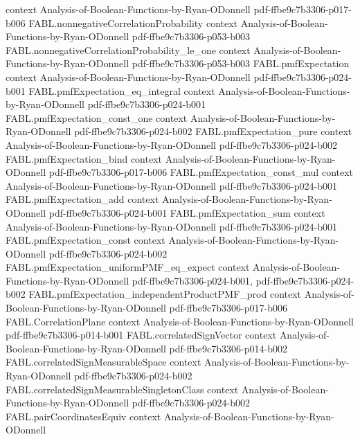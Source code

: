 \begin{theorem}
  {context}
  {Analysis-of-Boolean-Functions-by-Ryan-ODonnell}
  {pdf-ffbe9c7b3306-p017-b006}
\proofstep
  {FABL.nonnegativeCorrelationProbability}
  {context}
  {Analysis-of-Boolean-Functions-by-Ryan-ODonnell}
  {pdf-ffbe9c7b3306-p053-b003}
\proofstep
  {FABL.nonnegativeCorrelationProbability_le_one}
  {context}
  {Analysis-of-Boolean-Functions-by-Ryan-ODonnell}
  {pdf-ffbe9c7b3306-p053-b003}
\proofstep
  {FABL.pmfExpectation}
  {context}
  {Analysis-of-Boolean-Functions-by-Ryan-ODonnell}
  {pdf-ffbe9c7b3306-p024-b001}
\proofstep
  {FABL.pmfExpectation_eq_integral}
  {context}
  {Analysis-of-Boolean-Functions-by-Ryan-ODonnell}
  {pdf-ffbe9c7b3306-p024-b001}
\proofstep
  {FABL.pmfExpectation_const_one}
  {context}
  {Analysis-of-Boolean-Functions-by-Ryan-ODonnell}
  {pdf-ffbe9c7b3306-p024-b002}
\proofstep
  {FABL.pmfExpectation_pure}
  {context}
  {Analysis-of-Boolean-Functions-by-Ryan-ODonnell}
  {pdf-ffbe9c7b3306-p024-b002}
\proofstep
  {FABL.pmfExpectation_bind}
  {context}
  {Analysis-of-Boolean-Functions-by-Ryan-ODonnell}
  {pdf-ffbe9c7b3306-p017-b006}
\proofstep
  {FABL.pmfExpectation_const_mul}
  {context}
  {Analysis-of-Boolean-Functions-by-Ryan-ODonnell}
  {pdf-ffbe9c7b3306-p024-b001}
\proofstep
  {FABL.pmfExpectation_add}
  {context}
  {Analysis-of-Boolean-Functions-by-Ryan-ODonnell}
  {pdf-ffbe9c7b3306-p024-b001}
\proofstep
  {FABL.pmfExpectation_sum}
  {context}
  {Analysis-of-Boolean-Functions-by-Ryan-ODonnell}
  {pdf-ffbe9c7b3306-p024-b001}
\proofstep
  {FABL.pmfExpectation_const}
  {context}
  {Analysis-of-Boolean-Functions-by-Ryan-ODonnell}
  {pdf-ffbe9c7b3306-p024-b002}
\proofstep
  {FABL.pmfExpectation_uniformPMF_eq_expect}
  {context}
  {Analysis-of-Boolean-Functions-by-Ryan-ODonnell}
  {pdf-ffbe9c7b3306-p024-b001,
    pdf-ffbe9c7b3306-p024-b002}
\proofstep
  {FABL.pmfExpectation_independentProductPMF_prod}
  {context}
  {Analysis-of-Boolean-Functions-by-Ryan-ODonnell}
  {pdf-ffbe9c7b3306-p017-b006}
\proofstep
  {FABL.CorrelationPlane}
  {context}
  {Analysis-of-Boolean-Functions-by-Ryan-ODonnell}
  {pdf-ffbe9c7b3306-p014-b001}
\proofstep
  {FABL.correlatedSignVector}
  {context}
  {Analysis-of-Boolean-Functions-by-Ryan-ODonnell}
  {pdf-ffbe9c7b3306-p014-b002}
\proofstep
  {FABL.correlatedSignMeasurableSpace}
  {context}
  {Analysis-of-Boolean-Functions-by-Ryan-ODonnell}
  {pdf-ffbe9c7b3306-p024-b002}
\proofstep
  {FABL.correlatedSignMeasurableSingletonClass}
  {context}
  {Analysis-of-Boolean-Functions-by-Ryan-ODonnell}
  {pdf-ffbe9c7b3306-p024-b002}
\proofstep
  {FABL.pairCoordinatesEquiv}
  {context}
  {Analysis-of-Boolean-Functions-by-Ryan-ODonnell}

\end{theorem}
